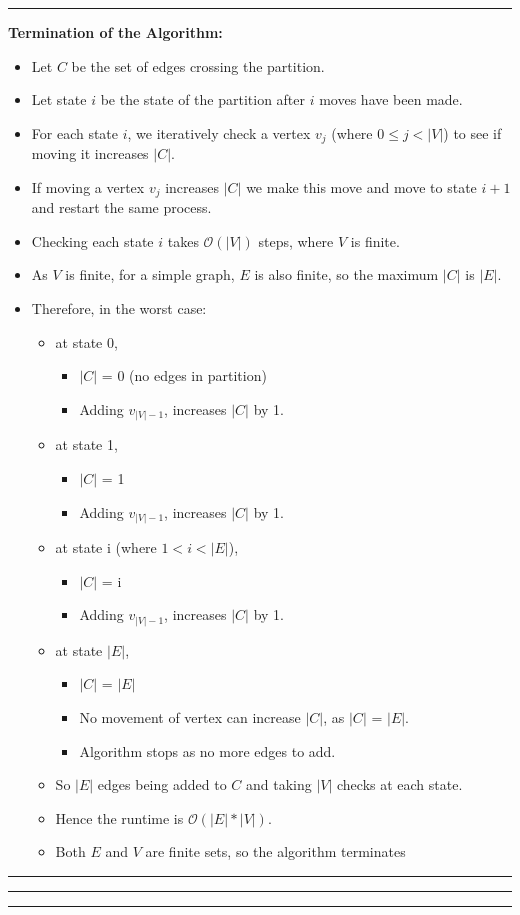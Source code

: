\documentclass[11pt, english]{article}
\newenvironment{answer}{%
  \par\noindent\hrule %
  \vspace{0.25\baselineskip}%
  \noindent{\Large\bfseries Answer}\par\vspace{0.25\baselineskip}\noindent\ignorespaces
}{%
  \par\vspace{0.5\baselineskip}%
  \noindent\hrule\vspace{0.5\baselineskip}%
  \hrule\hrule
}
\begin{document}
\begin{answer}
\noindent \textbf{Termination of the Algorithm:}
\begin{itemize}
    \item Let $C$ be the set of edges crossing the partition. 
    \item Let state $i$ be the state of the partition after $i$ moves have been made.
    \item For each state $i$, we iteratively check a vertex $v_{j}$ (where  $0 \leq j < |V|$) to see if moving it increases $|C|$. 
    \item If moving a vertex $v_{j}$ increases $|C|$ we make this move and move to state $i+1$ and restart the same process. 
    \item Checking each state $i$ takes $\mathcal{O}(|V|)$ steps, where $V$ is finite. 
    \item As $V$ is finite, for a simple graph, $E$ is also finite, so the maximum $|C|$ is $|E|$. 
    \item Therefore, in the worst case:
    \begin{itemize}
        \item at state 0,
          \begin{itemize}
              \item $|C|$ = 0 (no edges in partition)
              \item Adding $v_{|V|-1}$, increases $|C|$ by 1.
          \end{itemize}
        \item at state 1,
          \begin{itemize}
              \item $|C|$ = 1
              \item Adding $v_{|V|-1}$, increases $|C|$ by 1.
          \end{itemize}
        \item at state i (where $1 < i < |E|$),
          \begin{itemize}
                \item $|C|$ = i
                \item Adding $v_{|V|-1}$, increases $|C|$ by 1.
          \end{itemize}
        \item at state $|E|$,
          \begin{itemize}
              \item $|C|$ = $|E|$
              \item No movement of vertex can increase $|C|$, as $|C|$ = $|E|$.
              \item Algorithm stops as no more edges to add.
          \end{itemize}
        \item So $|E|$ edges being added to $C$ and taking $|V|$ checks at each state.
        \item Hence the runtime is $\mathcal{O}(|E| * |V|)$.
        \item Both $E$ and $V$ are finite sets, so the algorithm terminates
    \end{itemize}
\end{itemize}


\end{answer}
\end{document}
